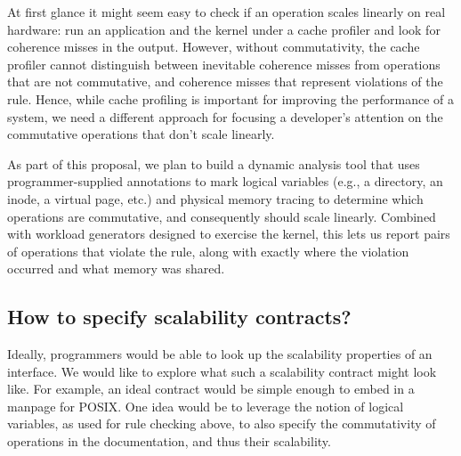 At first glance it might seem easy to check if an operation scales
linearly on real hardware: run an application and the kernel under a
cache profiler and look for coherence misses in the output.  However,
without commutativity, the cache profiler cannot distinguish between
inevitable coherence misses from operations that are not commutative,
and coherence misses that represent violations of the rule.  Hence, while
cache profiling is important for improving the performance of a system,
we need a different approach for focusing a developer's attention on
the commutative operations that don't scale linearly.

As part of this proposal, we plan to build a dynamic analysis tool that uses
programmer-supplied annotations to mark logical variables (e.g., a directory, an
inode, a virtual page, etc.) and physical memory tracing to determine which
operations are commutative, and consequently should scale linearly.  Combined
with workload generators designed to exercise the kernel, this lets us report
pairs of operations that violate the rule, along with exactly where the
violation occurred and what memory was shared.


\subsection{How to specify scalability contracts?}

Ideally, programmers would be able to look up the scalability properties
of an interface.  We would like to explore what such a scalability
contract might look like.  For example, an ideal contract would be simple
enough to embed in a manpage for POSIX\@.  One idea would be to leverage
the notion of logical variables, as used for rule checking above,
to also specify the commutativity of operations in the documentation,
and thus their scalability.
